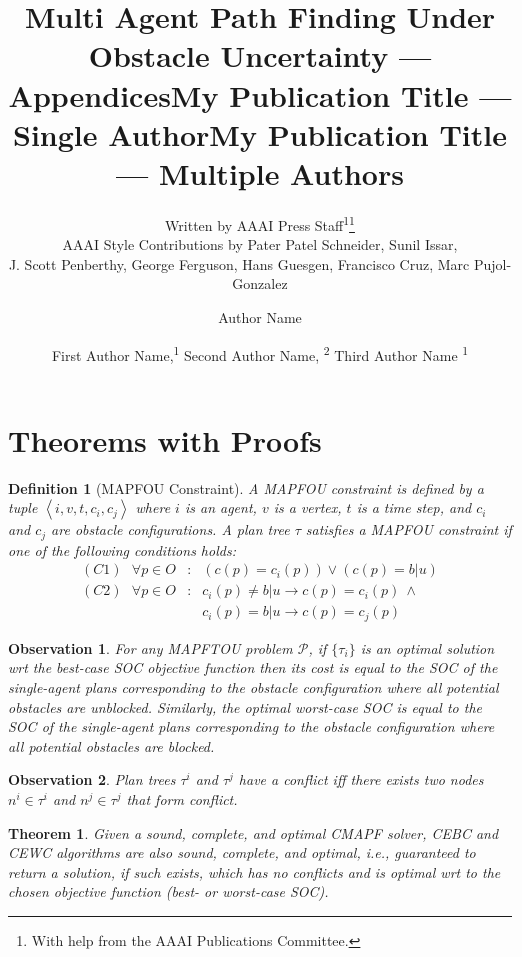 \documentclass[letterpaper]{article} %
\title{Multi Agent Path Finding Under Obstacle Uncertainty --- Appendices}
\author{
    Written by AAAI Press Staff\textsuperscript{\rm 1}\thanks{With help from the AAAI Publications Committee.}\\
    AAAI Style Contributions by Pater Patel Schneider,
    Sunil Issar,\\
    J. Scott Penberthy,
    George Ferguson,
    Hans Guesgen,
    Francisco Cruz\equalcontrib,
    Marc Pujol-Gonzalez\equalcontrib
}
\title{My Publication Title --- Single Author}
\author {
    Author Name
}
\title{My Publication Title --- Multiple Authors}
\author {
    First Author Name,\textsuperscript{\rm 1}
    Second Author Name, \textsuperscript{\rm 2}
    Third Author Name \textsuperscript{\rm 1}
}
\newcommand{\blocked}{\textit{blocked}}
\newcommand{\unblocked}{\textit{unblocked}}
\newcommand{\unknown}{\textit{b}|\textit{u}}
\newcommand{\tuple}[1]{\ensuremath{\left \langle #1 \right \rangle }}
\newtheorem{theorem}{Theorem}
\newtheorem{observation}{Observation}
\newtheorem{definition}{Definition}
\begin{document}
\maketitle



\section{Theorems with Proofs}

\begin{definition}[MAPFOU Constraint]
A MAPFOU constraint is defined by a tuple $\tuple{i,v,t,c_i,c_j}$ 
where $i$ is an agent, 
$v$ is a vertex,
$t$ is a time step, 
and $c_i$ and $c_j$ are obstacle configurations. 
A plan tree $\tau$ satisfies a MAPFOU constraint if one of the following conditions holds:
\begin{eqnarray}
(C1) ~~~ \forall p\in O&:& \left(c(p)=c_i(p)\right)\vee \left(c(p)=\unknown\right) \\
(C2) ~~~ \forall p\in O&:& c_i(p)\neq\unknown \rightarrow c(p)=c_i(p) ~ \wedge  \\
 &&   c_i(p)=\unknown \rightarrow c(p)=c_j(p)
\end{eqnarray}
\label{def:mapfou-constraint}
\end{definition}

\begin{observation}
For any MAPFTOU problem $\mathcal{P}$, if $\{\tau_i\}$ is an optimal solution wrt 
the best-case SOC objective function then its cost is equal to the SOC of the single-agent plans corresponding to the obstacle configuration where all potential obstacles are \unblocked. 
Similarly, the optimal worst-case SOC is equal to the SOC of the single-agent plans corresponding to the obstacle configuration where all potential obstacles are \blocked. 
\label{obs:best-and-worst}
\end{observation}

\begin{observation}
Plan trees $\tau^i$ and $\tau^j$ have a conflict 
iff there exists two nodes $n^i\in\tau^i$ and $n^j\in\tau^j$ that form conflict. 
\label{obs:conditionsForConflicts}
\end{observation} 

\begin{theorem}
Given a sound, complete, and optimal CMAPF solver, CEBC and CEWC algorithms are also sound, complete, and optimal, i.e., guaranteed to return a solution, if such exists, which has no conflicts and is optimal wrt to the chosen objective function (best- or worst-case SOC).
\end{theorem}
\end{document}
